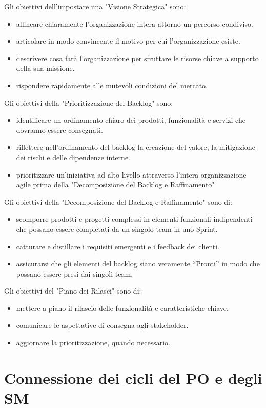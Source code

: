 \documentclass[12pt,a4paper,parskip=full]{scrartcl}
\begin{document}
Gli obiettivi dell'impostare una "Visione Strategica" sono:
\begin{itemize}
\item allineare chiaramente l'organizzazione intera attorno un percorso condiviso.
\item articolare in modo convincente il motivo per cui l'organizzazione esiste.
\item descrivere cosa farà l'organizzazione per sfruttare le risorse chiave a supporto della sua missione.
\item rispondere rapidamente alle mutevoli condizioni del mercato.
\end{itemize}
Gli obiettivi della "Prioritizzazione del Backlog" sono:
\begin{itemize}
\item identificare un ordinamento chiaro dei prodotti, funzionalità e servizi che dovranno essere consegnati.
\item riflettere nell'ordinamento del backlog la creazione del valore, la mitigazione dei rischi e delle dipendenze interne.
\item prioritizzare un'iniziativa ad alto livello attraverso l'intera organizzazione agile prima della "Decomposizione del Backlog e Raffinamento"
\end{itemize}
Gli obiettivi della "Decomposizione del Backlog e Raffinamento" sono di:
\begin{itemize}
\item scomporre prodotti e progetti complessi in elementi funzionali indipendenti che possano essere completati da un singolo team in uno Sprint.
\item catturare e distillare i requisiti emergenti e i feedback dei clienti.
\item assicurarsi che gli elementi del backlog siano veramente ``Pronti'' in modo che possano essere presi dai singoli team.
\end{itemize}
Gli obiettivi del "Piano dei Rilasci" sono di:
\begin{itemize}
\item mettere a piano il rilascio delle funzionalità e caratteristiche chiave.
\item comunicare le aspettative di consegna agli stakeholder.
\item aggiornare la prioritizzazione, quando necessario.
\end{itemize}

\section{Connessione dei cicli del PO e degli SM}
\end{document}
